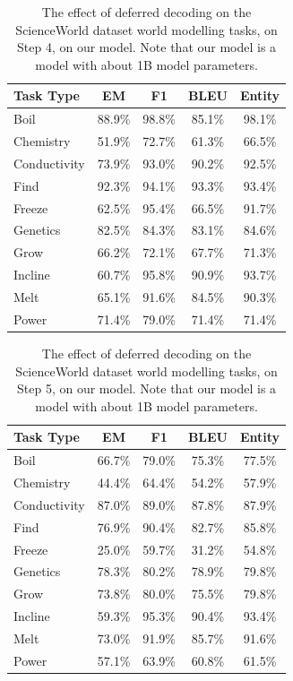 \begin{table}[h]
\centering
    \setlength\tabcolsep{15pt}
    \setlength\extrarowheight{0pt}
\caption{The effect of deferred decoding on the ScienceWorld dataset \citep{wang-etal-2022-scienceworld} world modelling tasks, on Step 4, on our model. Note that our model is a model with about 1B model parameters.}
\label{tab:scienceworld27}
\begin{tabular}{lcccc}
\toprule
\textbf{Task Type} & \textbf{EM} & \textbf{F1}
  & \textbf{BLEU} & \textbf{Entity}\\
\midrule
Boil & 88.9\% & 98.8\% & 85.1\% & 98.1\% \\
Chemistry & 51.9\% & 72.7\% & 61.3\% & 66.5\% \\
Conductivity & 73.9\% & 93.0\% & 90.2\% & 92.5\% \\
Find & 92.3\% & 94.1\% & 93.3\% & 93.4\% \\
Freeze & 62.5\% & 95.4\% & 66.5\% & 91.7\% \\
Genetics & 82.5\% & 84.3\% & 83.1\% & 84.6\% \\
Grow & 66.2\% & 72.1\% & 67.7\% & 71.3\% \\
Incline & 60.7\% & 95.8\% & 90.9\% & 93.7\% \\
Melt & 65.1\% & 91.6\% & 84.5\% & 90.3\% \\
Power & 71.4\% & 79.0\% & 71.4\% & 71.4\% \\

\bottomrule
\end{tabular}
\end{table}


\begin{table}[h]
\centering
    \setlength\tabcolsep{15pt}
    \setlength\extrarowheight{0pt}
\caption{The effect of deferred decoding on the ScienceWorld dataset \citep{wang-etal-2022-scienceworld} world modelling tasks, on Step 5, on our model. Note that our model is a model with about 1B model parameters.}
\label{tab:scienceworld28}
\begin{tabular}{lcccc}
\toprule
\textbf{Task Type} & \textbf{EM} & \textbf{F1}
  & \textbf{BLEU} & \textbf{Entity}\\
\midrule
Boil & 66.7\% & 79.0\% & 75.3\% & 77.5\% \\
Chemistry & 44.4\% & 64.4\% & 54.2\% & 57.9\% \\
Conductivity & 87.0\% & 89.0\% & 87.8\% & 87.9\% \\
Find & 76.9\% & 90.4\% & 82.7\% & 85.8\% \\
Freeze & 25.0\% & 59.7\% & 31.2\% & 54.8\% \\
Genetics & 78.3\% & 80.2\% & 78.9\% & 79.8\% \\
Grow & 73.8\% & 80.0\% & 75.5\% & 79.8\% \\
Incline & 59.3\% & 95.3\% & 90.4\% & 93.4\% \\
Melt & 73.0\% & 91.9\% & 85.7\% & 91.6\% \\
Power & 57.1\% & 63.9\% & 60.8\% & 61.5\% \\

\bottomrule
\end{tabular}
\end{table}




